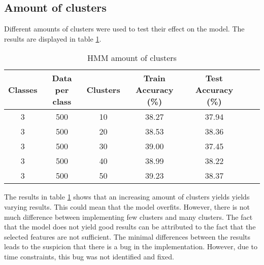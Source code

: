 \subsection*{Amount of clusters}
Different amounts of clusters were used to test their effect on the model. The results are displayed in table \ref{table:HMMclusters}.
\begin{table}[h!]
\begin{center}
\begin{tabular}{| c | c | c | c | c | c | c |}
\hline
 {\textbf{Classes}} 	 
 & {\textbf{Data per class}} 					& {\textbf{Clusters}} 
 & {\textbf{Train Accuracy (\%)}} 					& {\textbf{Test Accuracy (\%)}} 
 \\
\hline
3 	 		& 500 		& 10			& 38.27		& 37.94		\\
3 	 		& 500 		& 20			& 38.53		& 38.36		\\
3 	 		& 500 		& 30			& 39.00		& 37.45		\\
3 	 		& 500 		& 40			& 38.99		& 38.22		\\
3 	 		& 500 		& 50			& 39.23		& 38.37		\\
\hline
\end{tabular}
\caption{HMM amount of clusters}
\label{table:HMMclusters}
\end{center}
\end{table}

The results in table \ref{table:HMMclusters} shows that an increasing amount of clusters yields yields varying results. This could mean that the model overfits. However, there is not much difference between implementing few clusters and many clusters. The fact that the model does not yield good results can be attributed to the fact that the selected features are not sufficient. The minimal differences between the results leads to the suspicion that there is a bug in the implementation. However, due to time constraints, this bug was not identified and fixed.

